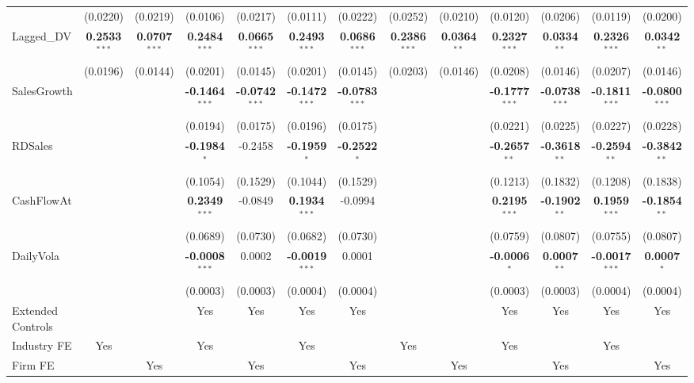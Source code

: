 \begin{landscape}
\begin{table}[H]
\begin{tabular}{lcccccccccccc}
 & (0.0220) & (0.0219) & (0.0106) & (0.0217) & (0.0111) & (0.0222) & (0.0252) & (0.0210) & (0.0120) & (0.0206) & (0.0119) & (0.0200) \\
Lagged\_DV & \textbf{0.2533}$^{***}$ & \textbf{0.0707}$^{***}$ & \textbf{0.2484}$^{***}$ & \textbf{0.0665}$^{***}$ & \textbf{0.2493}$^{***}$ & \textbf{0.0686}$^{***}$ & \textbf{0.2386}$^{***}$ & \textbf{0.0364}$^{**}$ & \textbf{0.2327}$^{***}$ & \textbf{0.0334}$^{**}$ & \textbf{0.2326}$^{***}$ & \textbf{0.0342}$^{**}$ \\
 & (0.0196) & (0.0144) & (0.0201) & (0.0145) & (0.0201) & (0.0145) & (0.0203) & (0.0146) & (0.0208) & (0.0146) & (0.0207) & (0.0146) \\
SalesGrowth &  &  & \textbf{-0.1464}$^{***}$ & \textbf{-0.0742}$^{***}$ & \textbf{-0.1472}$^{***}$ & \textbf{-0.0783}$^{***}$ &  &  & \textbf{-0.1777}$^{***}$ & \textbf{-0.0738}$^{***}$ & \textbf{-0.1811}$^{***}$ & \textbf{-0.0800}$^{***}$ \\
 &  &  & (0.0194) & (0.0175) & (0.0196) & (0.0175) &  &  & (0.0221) & (0.0225) & (0.0227) & (0.0228) \\
RDSales &  &  & \textbf{-0.1984}$^{*}$ & -0.2458 & \textbf{-0.1959}$^{*}$ & \textbf{-0.2522}$^{*}$ &  &  & \textbf{-0.2657}$^{**}$ & \textbf{-0.3618}$^{**}$ & \textbf{-0.2594}$^{**}$ & \textbf{-0.3842}$^{**}$ \\
 &  &  & (0.1054) & (0.1529) & (0.1044) & (0.1529) &  &  & (0.1213) & (0.1832) & (0.1208) & (0.1838) \\
CashFlowAt &  &  & \textbf{0.2349}$^{***}$ & -0.0849 & \textbf{0.1934}$^{***}$ & -0.0994 &  &  & \textbf{0.2195}$^{***}$ & \textbf{-0.1902}$^{**}$ & \textbf{0.1959}$^{***}$ & \textbf{-0.1854}$^{**}$ \\
 &  &  & (0.0689) & (0.0730) & (0.0682) & (0.0730) &  &  & (0.0759) & (0.0807) & (0.0755) & (0.0807) \\
DailyVola &  &  & \textbf{-0.0008}$^{***}$ & 0.0002 & \textbf{-0.0019}$^{***}$ & 0.0001 &  &  & \textbf{-0.0006}$^{*}$ & \textbf{0.0007}$^{**}$ & \textbf{-0.0017}$^{***}$ & \textbf{0.0007}$^{*}$ \\
 &  &  & (0.0003) & (0.0003) & (0.0004) & (0.0004) &  &  & (0.0003) & (0.0003) & (0.0004) & (0.0004) \\
\midrule
Extended Controls &  &  & Yes & Yes & Yes & Yes &  &  & Yes & Yes & Yes & Yes \\
Industry FE & Yes &  & Yes &  & Yes &  & Yes &  & Yes &  & Yes &  \\
Firm FE &  & Yes &  & Yes &  & Yes &  & Yes &  & Yes &  & Yes \\

\end{tabular}
\end{table}
\end{landscape}
